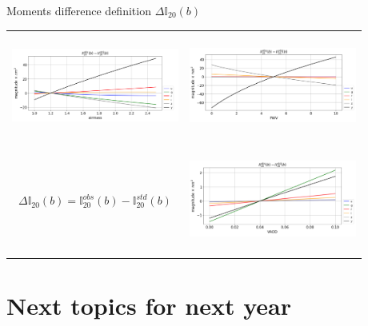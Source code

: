 \documentclass{beamer}
\begin{document}
\begin{frame}{Moments difference definition $\Delta \mathbb{I}_{20}(b)$}
\begin{tabular}{cc}
\includegraphics[width=5.5cm,height=3.5cm,angle=0]{figs/PCCorr/fig1_II20diff_airmass.png}
&
\includegraphics[width=5.5cm,height=3.5cm,angle=0]{figs/PCCorr/fig2_II20diff_PWV.png} \\

 $\boxed{\Delta \mathbb{I}_{20}(b)  =   \mathbb{I}_{20}^{obs}(b)  -  \mathbb{I}_{20}^{std}(b)}$ & \includegraphics[width=5.5cm,height=3.5cm,angle=0]{figs/PCCorr/fig3_II20diff_aer.png}
\end{tabular}
\end{frame}








\section{Next topics for next year}
\begin{frame}\sectionpage\end{frame}
\end{document}
